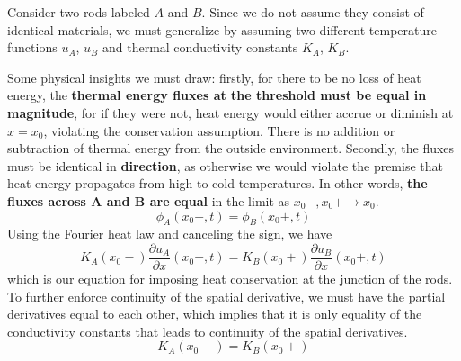 \documentclass[a4paper]{article}
\begin{document}
Consider two rods labeled \( A \) and \( B \). Since we do not assume they consist of identical materials, we must generalize by assuming two different temperature functions \( u_{A} \), \( u_{B} \) and thermal conductivity constants \( K_{A} \), \( K_{B} \).

\begin{center}
\end{center}

Some physical insights we must draw: firstly, for there to be no loss of heat energy, the \textbf{thermal energy fluxes at the threshold must be equal in magnitude}, for if they were not, heat energy would either accrue or diminish at \( x = x_{0} \), violating the conservation assumption. There is no addition or subtraction of thermal energy from the outside environment. Secondly, the fluxes must be identical in \textbf{direction}, as otherwise we would violate the premise that heat energy propagates from high to cold temperatures. In other words, \textbf{the fluxes across \( \pmb{A} \) and \( \pmb{B} \) are equal} in the limit as \( x_{0}-,x_{0}+ \rightarrow x_{0} \).
\[
	\phi_{A}\!\left( x_{0}-,t \right) = \phi_{B}\!\left( x_{0}+,t \right) 
\]
Using the Fourier heat law and canceling the sign, we have
\[
	K_{A}\!\left( x_{0}- \right)\frac{\partial u_{A}}{\partial x}\!\left( x_{0}-,t \right) = K_{B}\!\left( x_{0}+ \right)\frac{\partial u_{B}}{\partial x}\!\left( x_{0}+,t \right) 
\]
which is our equation for imposing heat conservation at the junction of the rods. To further enforce continuity of the spatial derivative, we must have the partial derivatives equal to each other, which implies that it is only equality of the conductivity constants that leads to continuity of the spatial derivatives.
\[
	K_{A}\!\left( x_{0}- \right) = K_{B}\!\left( x_{0}+ \right) 
\]
\end{document}
